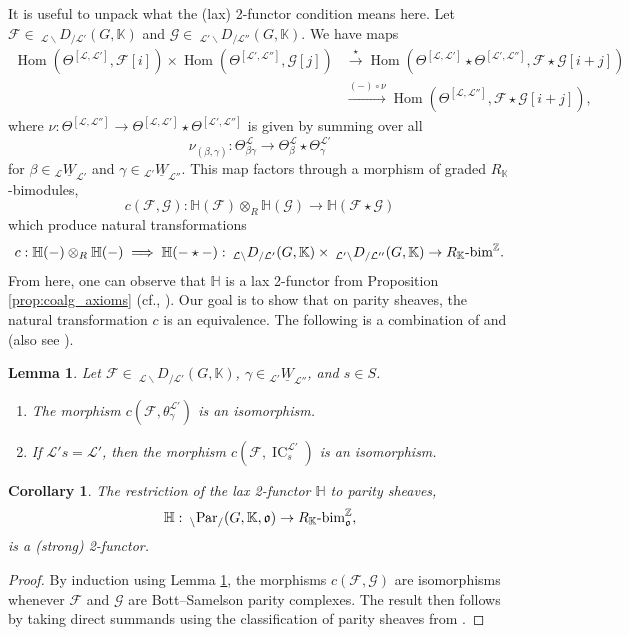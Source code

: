 \documentclass{amsart}
\newcommand{\Z}{\mathbb{Z}}
\newcommand{\K}{\mathbb{K}}
\renewcommand{\H}{\mathbb{H}}
\newcommand{\scrF}{\mathcal{F}}
\newcommand{\scrG}{\mathcal{G}}
\newcommand{\scrL}{\mathcal{L}}
\DeclareMathOperator{\Hom}{Hom}
\newcommand{\grbim}[1]{#1\textnormal{-bim}^{\Z}}
\DeclareMathOperator{\IC}{IC}
\newcommand{\fr}[1]{\mathfrak{#1}}
\newcommand{\DEE}[2]{\:_{#1 \backslash} D_{/ #2} }
\newcommand{\PEE}[2]{\:_{#1 \backslash} \textnormal{Par}_{/ #2} }
\newcommand{\uW}[2]{{}_{#1}\underline{W}_{#2}}
\newtheorem{corollary}[subsubsection]{Corollary}
\newtheorem{lemma}[subsubsection]{Lemma}
\theoremstyle{definition}
\numberwithin{equation}{subsection}
\begin{document}
It is useful to unpack what the (lax) 2-functor condition means here.
Let $\scrF \in \DEE{\scrL}{\scrL'} (G, \K)$ and $\scrG \in \DEE{\scrL'}{\scrL''} (G, \K)$.
We have maps
\begin{align*}
  \Hom (\Theta^{[\scrL, \scrL']}, \scrF [i]) \times \Hom (\Theta^{[\scrL', \scrL'']}, \scrG [j]) &\stackrel{\star}{\to} \Hom (\Theta^{[\scrL, \scrL']} \star \Theta^{[\scrL', \scrL'']}, \scrF \star \scrG [i+j]) \\
  &\stackrel{(-) \circ \nu}{\longrightarrow} \Hom (\Theta^{[\scrL, \scrL'']}, \scrF \star \scrG [i+j]),
\end{align*}
where $\nu : \Theta^{[\scrL, \scrL'']} \to \Theta^{[\scrL, \scrL']} \star \Theta^{[\scrL', \scrL'']}$ is given by summing over all
\[\nu_{(\beta, \gamma)} : \Theta_{\beta \gamma}^{\scrL} \to \Theta_{\beta}^{\scrL} \star \Theta_{\gamma}^{\scrL'}\]
for $\beta \in \uW{\scrL}{\scrL'}$ and $\gamma \in \uW{\scrL'}{\scrL''}$.
This map factors through a morphism of graded $R_{\K}$-bimodules,
\[ c ( \scrF, \scrG) : \H (\scrF) \otimes_R \H (\scrG) \to \H (\scrF \star \scrG)\]
which produce natural transformations
\[c : \H (-) \otimes_R \H (-) \implies \H (- \star -) : \DEE{\scrL}{\scrL'} (G, \K) \times \DEE{\scrL'}{\scrL''} (G, \K) \to \grbim{R_{\K}}.\]
From here, one can observe that $\H$ is a lax 2-functor from Proposition \ref{prop:coalg_axioms} (cf., \cite[\S 7.5]{LY}).
Our goal is to show that on parity sheaves, the natural transformation $c$ is an equivalence.
The following is a combination of \cite[Lemma 7.6]{LY} and \cite[Lemma 7.7]{LY} (also see \cite[Lemma 4.5.8]{Sandvik}).

\begin{lemma}\label{lem:lax_morphisms_props}
    Let $\scrF \in \DEE{\scrL}{\scrL'} (G, \K)$, $\gamma \in \uW{\scrL'}{\scrL''}$, and $s \in S$.
    \begin{enumerate}
        \item The morphism $c (\scrF, \theta^{\scrL'}_{\gamma})$ is an isomorphism.
        \item If $\scrL' s = \scrL'$, then the morphism $c (\scrF, \IC_s^{\scrL'})$ is an isomorphism.
    \end{enumerate}
\end{lemma}

\begin{corollary}\label{cor:H_functor_is_monoidal}
    The restriction of the lax 2-functor $\H$ to parity sheaves,
    \[\H : \PEE{}{} (G, \K, \fr{o}) \to \grbim{R_{\K}}_{\fr{o}},\]
    is a (strong) 2-functor.
\end{corollary}
\begin{proof}
    By induction using Lemma \ref{lem:lax_morphisms_props}, the morphisms $c (\scrF, \scrG)$ are isomorphisms whenever $\scrF$ and $\scrG$ are Bott--Samelson parity complexes.
    The result then follows by taking direct summands using the classification of parity sheaves from \cite[Theorem 3.4.1]{Sandvik}.
\end{proof}
\end{document}

